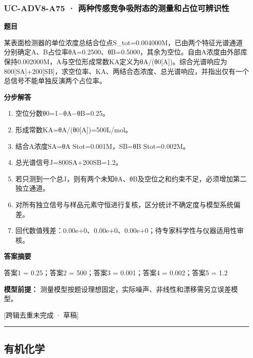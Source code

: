 \documentclass[UTF8,11pt,a4paper]{ctexart}
\begin{document}
\subsubsection*{UC-ADV8-A75 · 两种传感竞争吸附态的测量和占位可辨识性}
\noindent\textbf{题目}\par
某表面检测器的单位浓度总结合位点S\_tot=0.004000M，已由两个特征光谱通道分别确定A、B占位率θA=0.2500、θB=0.5000，其余为空位。自由A浓度由外部库保持0.002000M，A与空位形成常数KA定义为θA/(θ0[A])。综合光谱响应为800[SA]+200[SB]，求空位率、KA、两结合态浓度、总光谱响应，并指出仅有一个总信号不能单独反演两个占位率。\par
\medskip\noindent\textbf{分步解答}
\begin{enumerate}
\item 空位分数θ0=1−θA−θB=0.25。
\item 形成常数KA=θA/(θ0[A])=500L/mol。
\item 结合A浓度SA=θA Stot=0.001M，SB=θB Stot=0.002M。
\item 总光谱信号J=800SA+200SB=1.2。
\item 若只测到一个总J，则有两个未知θA、θB及空位之和约束不足，必须增加第二独立通道。
\item 对所有独立信号与样品元素守恒进行复核，区分统计不确定度与模型系统偏差。
\item 回代数值残差：0.00e+0、0.00e+0、0.00e+0；待专家科学性与仪器适用性审核。
\end{enumerate}
\noindent\textbf{答案摘要}\par
答案1 = 0.25；答案2 = 500；答案3 = 0.001；答案4 = 0.002；答案5 = 1.2\par
\noindent\textbf{模型前提：}
测量模型按题设理想固定，实际噪声、非线性和漂移需另立误差模型。\par
\noindent\textcolor{red!65!black}{[跨辑去重未完成 · 草稿]} \par
\medskip\hrule\medskip
\subsection*{有机化学}
\end{document}
